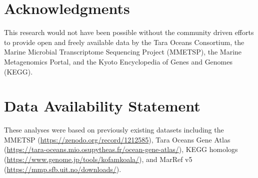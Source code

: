 \documentclass[utf8]{frontiersSCNS} %
\begin{document}
\section*{Acknowledgments}
This research would not have been possible without the community driven efforts to provide open and freely available data by the Tara Oceans Consortium, the Marine Microbial Transcriptome Sequencing Project (MMETSP), the Marine Metagenomics Portal, and the Kyoto Encyclopedia of Genes and Genomes (KEGG).  
\section*{Data Availability Statement}
These analyses were based on previously existing datasets including the MMETSP (\url{https://zenodo.org/record/1212585}), Tara Oceans Gene Atlas (\url{https://tara-oceans.mio.osupytheas.fr/ocean-gene-atlas/}), KEGG homologs (\url{https://www.genome.jp/tools/kofamkoala/}), and MarRef v5 (\url{https://mmp.sfb.uit.no/downloads/}). 




\end{document}

